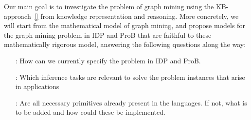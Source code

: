 Our main goal is to investigate the problem of graph mining using the KB-approach~\ref{} from knowledge representation and reasoning. 
More concretely, we will 
start from the mathematical model of graph mining, and
propose models for the graph mining problem in IDP and ProB that are faithful to these mathematically rigorous model,
answering the following questions along the way:
\begin{itemize}
\item[\Qone:] How can we currently specify the problem in IDP and ProB.
\item[\Qtwo:] Which inference tasks are relevant to solve the problem instances that arise in applications
\item[\Qthree:] Are all necessary primitives already present in the languages. If not, what is to be added and how could these be implemented.
\end{itemize}



